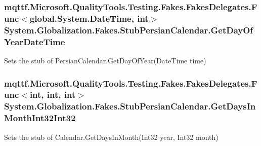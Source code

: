 \hypertarget{class_system_1_1_globalization_1_1_fakes_1_1_stub_persian_calendar_a0256884a1bd969b902e55fe746c1217e}{
\subsubsection[{Get\-Day\-Of\-Year\-Date\-Time}]{\setlength{\rightskip}{0pt plus 5cm}mqttf.\-Microsoft.\-Quality\-Tools.\-Testing.\-Fakes.\-Fakes\-Delegates.\-Func$<$global.\-System.\-Date\-Time, int$>$ System.\-Globalization.\-Fakes.\-Stub\-Persian\-Calendar.\-Get\-Day\-Of\-Year\-Date\-Time}}\label{class_system_1_1_globalization_1_1_fakes_1_1_stub_persian_calendar_a0256884a1bd969b902e55fe746c1217e}


Sets the stub of Persian\-Calendar.\-Get\-Day\-Of\-Year(\-Date\-Time time)

\hypertarget{class_system_1_1_globalization_1_1_fakes_1_1_stub_persian_calendar_ab0297fceb02c4b7ceecc4fb256be954f}{
\subsubsection[{Get\-Days\-In\-Month\-Int32\-Int32}]{\setlength{\rightskip}{0pt plus 5cm}mqttf.\-Microsoft.\-Quality\-Tools.\-Testing.\-Fakes.\-Fakes\-Delegates.\-Func$<$int, int, int$>$ System.\-Globalization.\-Fakes.\-Stub\-Persian\-Calendar.\-Get\-Days\-In\-Month\-Int32\-Int32}}\label{class_system_1_1_globalization_1_1_fakes_1_1_stub_persian_calendar_ab0297fceb02c4b7ceecc4fb256be954f}


Sets the stub of Calendar.\-Get\-Days\-In\-Month(\-Int32 year, Int32 month)

